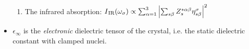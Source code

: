 \begin{frame}
\begin{itemize}
\begin{enumerate}
        \item The infrared absorption: $
            I\/_{\text{IR}}(\omega_\sigma)
            \propto
            \sum_{\alpha=1}^3
            \left|
              \sum_{s\beta}
              Z^{*\alpha\beta}_s \eta_{s\beta}^\sigma
            \right|^2
          $ 
        \end{enumerate}
        
    \item $\epsilon_\infty$ is the \emph{electronic} dielectric tensor of the
      crystal, i.e. the static dielectric constant with clamped nuclei.
  \end{itemize}
\end{frame}

